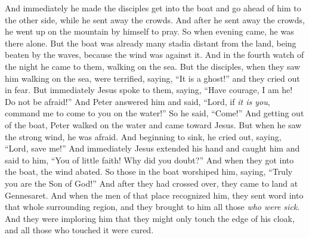 \begin{biblechapter}
 And immediately he made the disciples get into the boat and go ahead of him to the other side, while he sent away the crowds.
\verse And after he sent away the crowds, he went up on the mountain by himself to pray. So when evening came, he was there alone.
\verse But the boat was already many stadia distant from the land, being beaten by the waves, because the wind was against it.
\verse And in the fourth watch of the night he came to them, walking on the sea.
\verse But the disciples, when they saw him walking on the sea, were terrified, saying, “It is a ghost!” and they cried out in fear.
\verse But immediately Jesus spoke to them, saying, “Have courage, I am he! Do not be afraid!”
\verse And Peter answered him and said, “Lord, if \textit{it is you}, command me to come to you on the water!”
\verse So he said, “Come!” And getting out of the boat, Peter walked on the water and came toward Jesus.
\verse But when he saw the strong wind, he was afraid. And beginning to sink, he cried out, saying, “Lord, save me!”
\verse And immediately Jesus extended his hand and caught him and said to him, “You of little faith! Why did you doubt?”
\verse And when they got into the boat, the wind abated.
\verse So those in the boat worshiped him, saying, “Truly you are the Son of God!”
 And after they had crossed over, they came to land at Gennesaret.
\verse And when the men of that place recognized him, they sent word into that whole surrounding region, and they brought to him all those \textit{who were sick}.
\verse And they were imploring him that they might only touch the edge of his cloak, and all those who touched it were cured.
\end{biblechapter}

